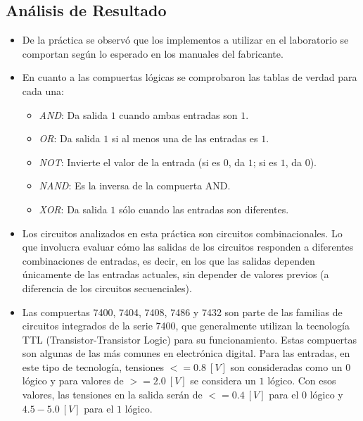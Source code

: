 \subsection{Análisis de Resultado\label{sec:analisis2}}
\begin{itemize}
    \item De la práctica se observó que los implementos a utilizar en el laboratorio se comportan según lo esperado en los manuales del fabricante.
    \item En cuanto a las compuertas lógicas se comprobaron las tablas de verdad para cada una:
    \begin{itemize}
    		\item \textit{AND}: Da salida $1$ cuando ambas entradas son $1$.
    		\item \textit{OR}: Da salida $1$ si al menos una de las entradas es $1$.
    		\item \textit{NOT}: Invierte el valor de la entrada (si es $0$, da $1$; si es $1$, da $0$).
    		\item \textit{NAND}: Es la inversa de la compuerta AND.
    		\item \textit{XOR}: Da salida $1$ sólo cuando las entradas son diferentes.
	\end{itemize}
	
    \item Los circuitos analizados en esta práctica son circuitos combinacionales. Lo que involucra evaluar cómo las salidas de los circuitos responden a diferentes combinaciones de entradas, es decir, en los que las salidas dependen únicamente de las entradas actuales, sin depender de valores previos (a diferencia de los circuitos secuenciales).
    
    \item Las compuertas 7400, 7404, 7408, 7486 y 7432 son parte de las familias de circuitos integrados de la serie 7400, que generalmente utilizan la tecnología TTL (Transistor-Transistor Logic) para su funcionamiento. Estas compuertas son algunas de las más comunes en electrónica digital. Para las entradas, en este tipo de tecnología, tensiones $<= 0.8~[V]$ son consideradas como un $0$ lógico y para valores de $>= 2.0~[V]$ se considera un $1$ lógico. Con esos valores, las tensiones en la salida serán de $<= 0.4~[V]$ para el $0$ lógico y $4.5 - 5.0~[V]$ para el $1$ lógico.
    

\end{itemize}
